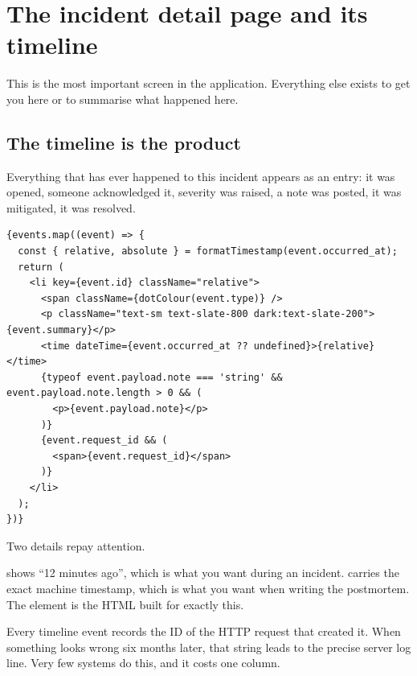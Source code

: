 \chapter{The incident detail page and its timeline}
\label{ch:detail}


This is the most important screen in the application. Everything else exists to
get you here or to summarise what happened here.

\section{The timeline is the product}

Everything that has ever happened to this incident appears as an entry: it was
opened, someone acknowledged it, severity was raised, a note was posted, it was
mitigated, it was resolved.

\begin{lstlisting}[language=tsx]
{events.map((event) => {
  const { relative, absolute } = formatTimestamp(event.occurred_at);
  return (
    <li key={event.id} className="relative">
      <span className={dotColour(event.type)} />
      <p className="text-sm text-slate-800 dark:text-slate-200">{event.summary}</p>
      <time dateTime={event.occurred_at ?? undefined}>{relative}</time>
      {typeof event.payload.note === 'string' && event.payload.note.length > 0 && (
        <p>{event.payload.note}</p>
      )}
      {event.request_id && (
        <span>{event.request_id}</span>
      )}
    </li>
  );
})}
\end{lstlisting}

Two details repay attention.

\begin{description}[leftmargin=1.2cm,style=nextline]
\item[Both time formats]  shows ``12 minutes ago'', which is what
  you want during an incident.  carries the exact machine
  timestamp, which is what you want when writing the postmortem. The
   element is the HTML built for exactly this.
\item[\fpath{request\_id} on the entry] Every timeline event records the ID of
  the HTTP request that created it. When something looks wrong six months later,
  that string leads to the precise server log line. Very few systems do this,
  and it costs one column.
\end{description}

